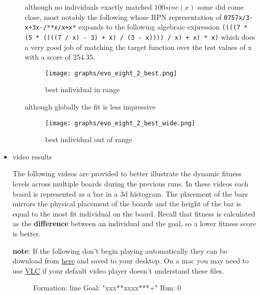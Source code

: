 \documentclass[11pt]{article}
\begin{document}
\begin{itemize}
\begin{itemize}
although no individuals exactly matched $100 sine(x)$ some did come
close, most notably the following whose RPN representation of
\texttt{0757x/3-x+3x-/**x/x+x*} expands to the following algebraic expression
\texttt{((((7 * (5 * ((((7 / x) - 3) + x) / (3 - x)))) / x) + x) * x)} which
does a very good job of matching the target function over the test
values of x with a score of 254.35.



\begin{figure}[htb]
\centering
\texttt{[image: graphs/evo\_eight\_2\_best.png]}
\caption{best individual in range}
\end{figure}

although globally the fit is less impressive



\begin{figure}[htb]
\centering
\texttt{[image: graphs/evo\_eight\_2\_best\_wide.png]}
\caption{best individual out of range}
\end{figure}

\end{itemize} %

\item video results\\
\label{sec-1.5.3.3}

The following videos are provided to better illustrate the dynamic
fitness levels across multiple boards during the previous runs.  In
these videos each board is represented as a bar in a 3d histogram.
The placement of the bars mirrors the physical placement of the boards
and the height of the bar is equal to the most fit individual on the
board.  Recall that fitness is calculated as the \textbf{difference} between
an individual and the goal, so a lower fitness score is better.

\textbf{note}: If the following don't begin playing automatically they can be
download from \href{http://cs.unm.edu/~eschulte/classes/cs591-rpc/gp4ixm-report/videos}{here} and saved to your desktop.  On a mac you may need
to use \href{http://www.videolan.org/vlc/}{VLC} if your default video player doesn't understand these
files.

  \begin{figure}
  \centering
  \caption{Formation: line Goal: "xxx**xxxx***+" Run: 0}
  \end{figure}



\end{itemize}
\end{document}
